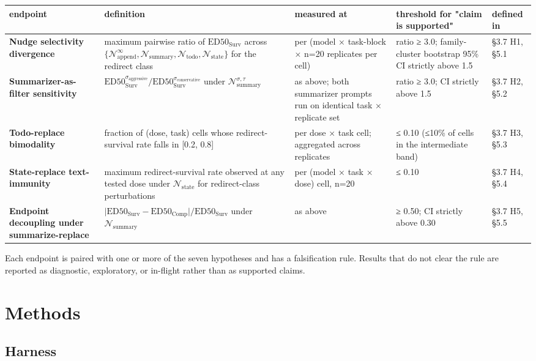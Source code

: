 \documentclass{article}
\theoremstyle{plain}
\theoremstyle{definition}
\begin{document}
\begin{table}[h!]
\centering
\small
\begin{tabularx}{\textwidth}{lYYYY}
\toprule
endpoint & definition & measured at & threshold for "claim is supported" & defined in \\
\midrule
\textbf{Nudge selectivity divergence} & maximum pairwise ratio of $\text{ED50}_\text{Surv}$ across $\{\mathcal{N}_\text{append}^\infty, \mathcal{N}_\text{summary}, \mathcal{N}_\text{todo}, \mathcal{N}_\text{state}\}$ for the redirect class & per (model × task-block × n=20 replicates per cell) & ratio ≥ 3.0; family-cluster bootstrap 95\% CI strictly above 1.5 & §3.7 H1, §5.1 \\
\textbf{Summarizer-as-filter sensitivity} & $\text{ED50}_\text{Surv}^{\sigma_\text{aggressive}} / \text{ED50}_\text{Surv}^{\sigma_\text{conservative}}$ under $\mathcal{N}_\text{summary}^{\sigma, \tau}$ & as above; both summarizer prompts run on identical task × replicate set & ratio ≥ 3.0; CI strictly above 1.5 & §3.7 H2, §5.2 \\
\textbf{Todo-replace bimodality} & fraction of (dose, task) cells whose redirect-survival rate falls in [0.2, 0.8] & per dose × task cell; aggregated across replicates & ≤ 0.10 (≤10\% of cells in the intermediate band) & §3.7 H3, §5.3 \\
\textbf{State-replace text-immunity} & maximum redirect-survival rate observed at any tested dose under $\mathcal{N}_\text{state}$ for redirect-class perturbations & per (model × task × dose) cell, n=20 & ≤ 0.10 & §3.7 H4, §5.4 \\
\textbf{Endpoint decoupling under summarize-replace} & $\bigl| \text{ED50}_\text{Surv} - \text{ED50}_\text{Comp} \bigr| / \text{ED50}_\text{Surv}$ under $\mathcal{N}_\text{summary}$ & as above & ≥ 0.50; CI strictly above 0.30 & §3.7 H5, §5.5 \\
\bottomrule
\end{tabularx}
\end{table}

Each endpoint is paired with one or more of the seven hypotheses and has a falsification rule. Results that do not clear the rule are reported as diagnostic, exploratory, or in-flight rather than as supported claims.


\section{Methods}

\subsection{Harness}
\end{document}
